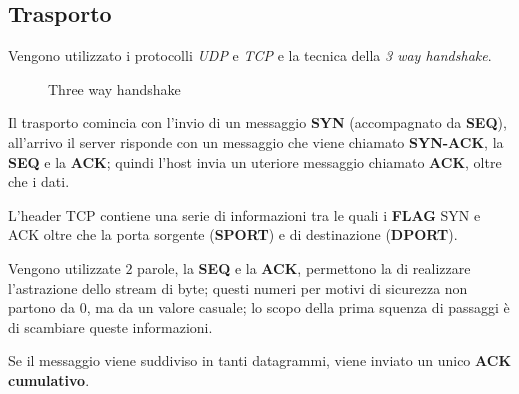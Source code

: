 \subsection{Trasporto}
Vengono utilizzato i protocolli \emph{UDP} e \emph{TCP} e la tecnica della
\emph{3 way handshake}.

\begin{figure}[ht]
    \centering
    \caption{Three way handshake}
    \label{fig:3some}
\end{figure}

Il trasporto comincia con l'invio di un messaggio \textbf{SYN} (accompagnato
da \textbf{SEQ}), all'arrivo
il server risponde con un messaggio che viene chiamato \textbf{SYN-ACK}, la
\textbf{SEQ} e la \textbf{ACK};
quindi l'host invia un uteriore messaggio chiamato \textbf{ACK}, oltre che
i dati.

L'header TCP contiene una serie di informazioni tra le quali i \textbf{FLAG}
SYN e ACK oltre che la porta sorgente (\textbf{SPORT}) e di destinazione
(\textbf{DPORT}).


Vengono utilizzate $2$ parole, la \textbf{SEQ} e la \textbf{ACK}, permettono
la di realizzare l'astrazione dello stream di byte; questi numeri per motivi
di sicurezza non partono da $0$, ma da un valore casuale; lo scopo della
prima squenza di passaggi è di scambiare queste informazioni.

Se il messaggio viene suddiviso in tanti datagrammi, viene inviato un unico
\textbf{ACK cumulativo}.
